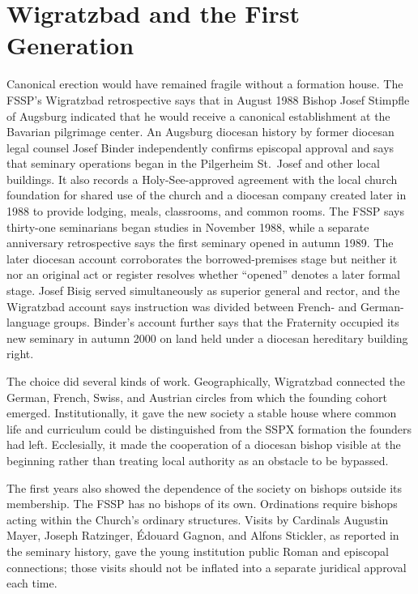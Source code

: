 \section{Wigratzbad and the First Generation}

Canonical erection would have remained fragile without a formation house. The FSSP's Wigratzbad retrospective says that in August 1988 Bishop Josef Stimpfle of Augsburg indicated that he would receive a canonical establishment at the Bavarian pilgrimage center. An Augsburg diocesan history by former diocesan legal counsel Josef Binder independently confirms episcopal approval and says that seminary operations began in the Pilgerheim St.~Josef and other local buildings. It also records a Holy-See-approved agreement with the local church foundation for shared use of the church and a diocesan company created later in 1988 to provide lodging, meals, classrooms, and common rooms. The FSSP says thirty-one seminarians began studies in November 1988, while a separate anniversary retrospective says the first seminary opened in autumn 1989. The later diocesan account corroborates the borrowed-premises stage but neither it nor an original act or register resolves whether ``opened'' denotes a later formal stage. Josef Bisig served simultaneously as superior general and rector, and the Wigratzbad account says instruction was divided between French- and German-language groups. Binder's account further says that the Fraternity occupied its new seminary in autumn 2000 on land held under a diocesan hereditary building right.

The choice did several kinds of work. Geographically, Wigratzbad connected the German, French, Swiss, and Austrian circles from which the founding cohort emerged. Institutionally, it gave the new society a stable house where common life and curriculum could be distinguished from the SSPX formation the founders had left. Ecclesially, it made the cooperation of a diocesan bishop visible at the beginning rather than treating local authority as an obstacle to be bypassed.

The first years also showed the dependence of the society on bishops outside its membership. The FSSP has no bishops of its own. Ordinations require bishops acting within the Church's ordinary structures. Visits by Cardinals Augustin Mayer, Joseph Ratzinger, Édouard Gagnon, and Alfons Stickler, as reported in the seminary history, gave the young institution public Roman and episcopal connections; those visits should not be inflated into a separate juridical approval each time.

